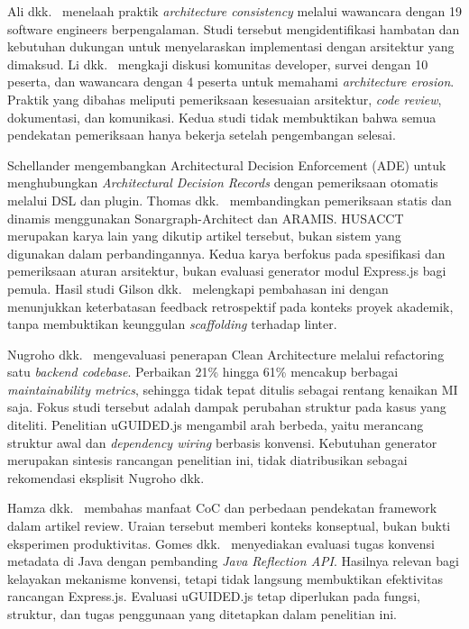 \documentclass[12pt,a4paper,oneside]{report}
\begin{document}
Ali dkk.\ \cite{ali2017architecture} menelaah praktik \textit{architecture consistency} melalui wawancara dengan 19 software engineers berpengalaman. Studi tersebut mengidentifikasi hambatan dan kebutuhan dukungan untuk menyelaraskan implementasi dengan arsitektur yang dimaksud. Li dkk.\ \cite{strasser2021understanding} mengkaji diskusi komunitas developer, survei dengan 10 peserta, dan wawancara dengan 4 peserta untuk memahami \textit{architecture erosion}. Praktik yang dibahas meliputi pemeriksaan kesesuaian arsitektur, \textit{code review}, dokumentasi, dan komunikasi. Kedua studi tidak membuktikan bahwa semua pendekatan pemeriksaan hanya bekerja setelah pengembangan selesai.

Schellander \cite{schellander2024decisions} mengembangkan Architectural Decision Enforcement (ADE) untuk menghubungkan \textit{Architectural Decision Records} dengan pemeriksaan otomatis melalui DSL dan plugin. Thomas dkk.\ \cite{pruijt2017husacct} membandingkan pemeriksaan statis dan dinamis menggunakan Sonargraph-Architect dan ARAMIS. HUSACCT merupakan karya lain yang dikutip artikel tersebut, bukan sistem yang digunakan dalam perbandingannya. Kedua karya berfokus pada spesifikasi dan pemeriksaan aturan arsitektur, bukan evaluasi generator modul Express.js bagi pemula. Hasil studi Gilson dkk.\ \cite{gilson2020junior} melengkapi pembahasan ini dengan menunjukkan keterbatasan feedback retrospektif pada konteks proyek akademik, tanpa membuktikan keunggulan \textit{scaffolding} terhadap linter.

Nugroho dkk.\ \cite{nugroho2022clean} mengevaluasi penerapan Clean Architecture melalui refactoring satu \textit{backend \textit{codebase}}. Perbaikan 21\% hingga 61\% mencakup berbagai \textit{maintainability metrics}, sehingga tidak tepat ditulis sebagai rentang kenaikan MI saja. Fokus studi tersebut adalah dampak perubahan struktur pada kasus yang diteliti. Penelitian uGUIDED.js mengambil arah berbeda, yaitu merancang struktur awal dan \textit{dependency wiring} berbasis konvensi. Kebutuhan generator merupakan sintesis rancangan penelitian ini, tidak diatribusikan sebagai rekomendasi eksplisit Nugroho dkk.

Hamza dkk.\ \cite{ijres2023coc} membahas manfaat CoC dan perbedaan pendekatan framework dalam artikel review. Uraian tersebut memberi konteks konseptual, bukan bukti eksperimen produktivitas. Gomes dkk.\ \cite{esfinge2025coc} menyediakan evaluasi tugas konvensi metadata di Java dengan pembanding \textit{Java Reflection API}. Hasilnya relevan bagi kelayakan mekanisme konvensi, tetapi tidak langsung membuktikan efektivitas rancangan Express.js. Evaluasi uGUIDED.js tetap diperlukan pada fungsi, struktur, dan tugas penggunaan yang ditetapkan dalam penelitian ini.
\end{document}
